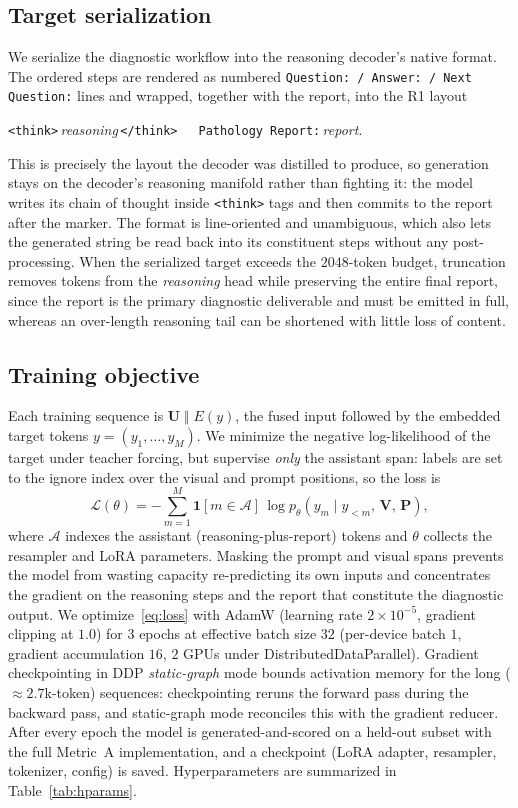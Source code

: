 \documentclass[11pt]{article}
\newcommand{\code}[1]{\texttt{\small #1}}
\newcommand{\Vvis}{\mathbf{V}}
\newcommand{\Prompt}{\mathbf{P}}
\begin{document}
\subsection{Target serialization}
\label{sec:format}
We serialize the diagnostic workflow into the reasoning decoder's native format.
The ordered steps are rendered as numbered \code{Question:\,/\,Answer:\,/\,Next
Question:} lines and wrapped, together with the report, into the R1 layout
\begin{center}
\code{<think>}\,\emph{reasoning}\,\code{</think>}\ \ \ \code{Pathology Report:}\,\emph{report}.
\end{center}
This is precisely the layout the decoder was distilled to produce, so generation
stays on the decoder's reasoning manifold rather than fighting it: the model
writes its chain of thought inside \code{<think>} tags and then commits to the
report after the marker. The format is line-oriented and unambiguous, which also
lets the generated string be read back into its constituent steps without any
post-processing. When the serialized target exceeds the $2048$-token budget,
truncation removes tokens from the \emph{reasoning} head while preserving the
entire final report, since the report is the primary diagnostic deliverable and
must be emitted in full, whereas an over-length reasoning tail can be shortened
with little loss of content.

\subsection{Training objective}
\label{sec:objective}
Each training sequence is $\mathbf{U}\;\Vert\;E(y)$, the fused input followed by
the embedded target tokens $y=(y_1,\dots,y_M)$. We minimize the negative
log-likelihood of the target under teacher forcing, but supervise \emph{only} the
assistant span: labels are set to the ignore index over the visual and prompt
positions, so the loss is
\begin{equation}
\label{eq:loss}
\mathcal{L}(\theta)= -\sum_{m=1}^{M}\mathbf{1}\!\left[m\in\mathcal{A}\right]\,
\log p_\theta\!\left(y_m \mid y_{<m},\,\Vvis,\,\Prompt\right),
\end{equation}
where $\mathcal{A}$ indexes the assistant (reasoning-plus-report) tokens and
$\theta$ collects the resampler and LoRA parameters. Masking the prompt and visual
spans prevents the model from wasting capacity re-predicting its own inputs and
concentrates the gradient on the reasoning steps and the report that constitute
the diagnostic output. We optimize~\eqref{eq:loss} with
AdamW (learning rate $2\times10^{-5}$, gradient clipping at $1.0$) for $3$ epochs
at effective batch size $32$ (per-device batch $1$, gradient accumulation $16$,
$2$ GPUs under DistributedDataParallel). Gradient checkpointing in DDP
\emph{static-graph} mode bounds activation memory for the long ($\approx\!2.7$k-token)
sequences: checkpointing reruns the forward pass during the backward pass, and
static-graph mode reconciles this with the gradient reducer. After every epoch the
model is generated-and-scored on a held-out subset with the full Metric~A
implementation, and a checkpoint (LoRA adapter, resampler, tokenizer, config) is
saved. Hyperparameters are summarized in Table~\ref{tab:hparams}.
\end{document}
